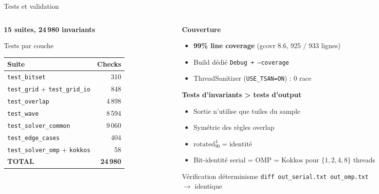 \documentclass[aspectratio=169,11pt]{beamer}
\begin{document}
\begin{frame}{Tests et validation}
\begin{columns}[T]
\begin{column}{0.50\textwidth}
\textbf{15 suites, 24\,980 invariants}
\begin{block}{Tests par couche}
\centering
\footnotesize
\begin{tabular}{lr}
\toprule
\textbf{Suite} & \textbf{Checks} \\
\midrule
\texttt{test\_bitset} & 310 \\
\texttt{test\_grid} + \texttt{test\_grid\_io} & 848 \\
\texttt{test\_overlap} & 4\,898 \\
\texttt{test\_wave} & 8\,594 \\
\texttt{test\_solver\_common} & 9\,060 \\
\texttt{test\_edge\_cases} & 404 \\
\texttt{test\_solver\_omp} + \texttt{kokkos} & 58 \\
\midrule
\textbf{TOTAL} & \textbf{24\,980} \\
\bottomrule
\end{tabular}
\end{block}
\end{column}
\begin{column}{0.46\textwidth}
\textbf{Couverture}
\begin{itemize}
\footnotesize
    \item \textbf{99\% line coverage} (gcovr 8.6, 925 / 933 lignes)
    \item Build dédié \texttt{Debug + --coverage}
    \item ThreadSanitizer (\texttt{USE\_TSAN=ON}) : 0 race
\end{itemize}

\vspace{0.2cm}
\textbf{Tests d'invariants > tests d'output}
\begin{itemize}
\footnotesize
    \item Sortie n'utilise que tuiles du sample
    \item Symétrie des règles overlap
    \item $\text{rotated}_{90}^4 = \text{identité}$
    \item Bit-identité serial = OMP = Kokkos pour $\{1, 2, 4, 8\}$ threads
\end{itemize}

\vspace{0.2cm}
\begin{exampleblock}{Vérification déterminisme}
\centering
\footnotesize
\texttt{diff out\_serial.txt out\_omp.txt} \\
$\to$ identique
\end{exampleblock}
\end{column}
\end{columns}
\end{frame}
\end{document}
